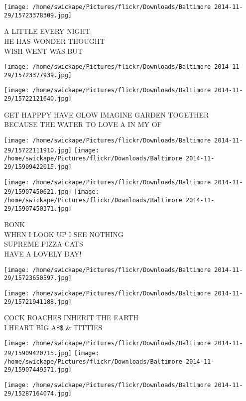 \documentclass[10pt,letterpaper]{article}
\begin{document}
\vspace{0.25in}
\texttt{[image: /home/swickape/Pictures/flickr/Downloads/Baltimore 2014-11-29/15723378309.jpg]}

A LITTLE EVERY NIGHT\\
HE HAS WONDER THOUGHT\\
WISH WENT WAS BUT
\pagebreak

\texttt{[image: /home/swickape/Pictures/flickr/Downloads/Baltimore 2014-11-29/15723377939.jpg]}

\vspace{0.25in}
\texttt{[image: /home/swickape/Pictures/flickr/Downloads/Baltimore 2014-11-29/15722121640.jpg]}

GET HAPPPY HAVE GLOW IMAGINE GARDEN TOGETHER\\
BECAUSE THE WATER TO LOVE A IN MY OF
\pagebreak

\texttt{[image: /home/swickape/Pictures/flickr/Downloads/Baltimore 2014-11-29/15722111910.jpg]}
\texttt{[image: /home/swickape/Pictures/flickr/Downloads/Baltimore 2014-11-29/15909422015.jpg]}

\texttt{[image: /home/swickape/Pictures/flickr/Downloads/Baltimore 2014-11-29/15907450621.jpg]}
\texttt{[image: /home/swickape/Pictures/flickr/Downloads/Baltimore 2014-11-29/15907450371.jpg]}

BONK\\
WHEN I LOOK UP I SEE NOTHING\\
SUPREME PIZZA CATS\\
HAVE A LOVELY DAY!
\pagebreak

\texttt{[image: /home/swickape/Pictures/flickr/Downloads/Baltimore 2014-11-29/15723650597.jpg]}

\vspace{0.25in}
\texttt{[image: /home/swickape/Pictures/flickr/Downloads/Baltimore 2014-11-29/15721941188.jpg]}

COCK ROACHES INHERIT THE EARTH\\
I HEART BIG A\$\$ \& TITTIES
\pagebreak

\texttt{[image: /home/swickape/Pictures/flickr/Downloads/Baltimore 2014-11-29/15909420715.jpg]}
\texttt{[image: /home/swickape/Pictures/flickr/Downloads/Baltimore 2014-11-29/15907449571.jpg]}

\vspace{0.25in}
\texttt{[image: /home/swickape/Pictures/flickr/Downloads/Baltimore 2014-11-29/15287164074.jpg]}
\end{document}

